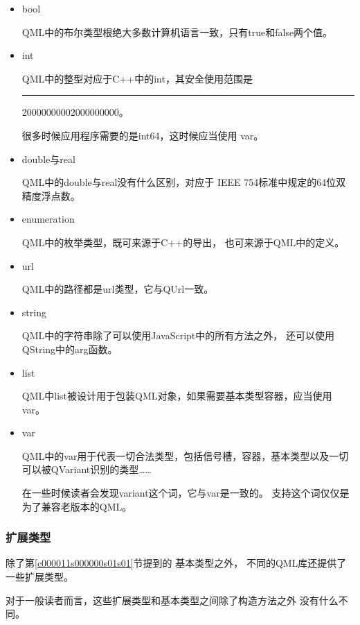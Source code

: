 \begin{itemize}

\item bool

QML中的布尔类型根绝大多数计算机语言一致，只有true和false两个值。
\item int

QML中的整型对应于C{\sourcefonttwo{}+}{\sourcefonttwo{}+}中的int，其安全使用范围是
\hspace{0.05em}\rule[0.7ex]{0.4em}{0.65pt}\hspace{0.05em}2000000000\raisebox{0.16ex}{\sourcefonttwo\~{}}2000000000。

很多时候应用程序需要的是int64，这时候应当使用
var。

\item double与real

QML中的double与real没有什么区别，对应于
IEEE 754标准中规定的64位双精度浮点数。
\item enumeration

QML中的枚举类型，既可来源于C{\sourcefonttwo{}+}{\sourcefonttwo{}+}的导出，
也可来源于QML中的定义。
\item url

QML中的路径都是url类型，它与QUrl一致。
\item string

QML中的字符串除了可以使用JavaScript中的所有方法之外，
还可以使用QString中的arg函数。
\item list

QML中list被设计用于包装QML对象，如果需要基本类型容器，应当使用var。
\item var

QML中的var用于代表一切合法类型，包括信号槽，容器，基本类型以及一切
可以被QVariant识别的类型……

在一些时候读者会发现variant这个词，它与var是一致的。
支持这个词仅仅是为了兼容老版本的QML。

\end{itemize}

\FloatBarrier
\subsubsection{
扩展类型
}\label{c000011s000000s01s02}

除了第\ref{c000011s000000s01s01}节提到的
基本类型之外，
不同的QML库还提供了一些扩展类型。

对于一般读者而言，这些扩展类型和基本类型之间除了构造方法之外
没有什么不同。


\FloatBarrier
